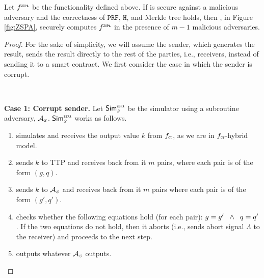 

\begin{theorem}\label{theorem::ZSPA-comp-correctness}
Let $f^{\scriptscriptstyle \mathtt{ZSPA}}$ be the functionality defined above. If \ct is secure against a malicious adversary and the correctness of $\mathtt{PRF}$, $\mathtt{H}$, and Merkle tree holds, then \zspa,  in Figure \ref{fig:ZSPA}, securely computes $f^{\scriptscriptstyle \mathtt{ZSPA}}$ in the presence of $m-1 $ malicious  adversaries. 
\end{theorem}


\begin{proof}
For the sake of simplicity, we will assume the sender, which generates the result, sends the result directly to the rest of the parties, i.e., receivers, instead of sending it to a smart contract. We first consider the case in which the sender is corrupt. 

\

\noindent\textbf{Case 1: Corrupt sender.}  Let $\mathsf{Sim}^{\scriptscriptstyle \mathtt{ZSPA}}_{\scriptscriptstyle S}$ be the simulator using a subroutine adversary, $\mathcal{A}_{\scriptscriptstyle S}$. $\mathsf{Sim}^{\scriptscriptstyle \mathtt{ZSPA}}_{\scriptscriptstyle S}$ works as follows. 
%
\begin{enumerate}
%
\item simulates  \ct  and receives the output value $k$ from $f_{\scriptscriptstyle \mathtt{CT}}$, as we are in $f_{\scriptscriptstyle \mathtt{CT}}$-hybrid model.
%
\item sends $k$ to TTP and receives back from it $m$ pairs, where each pair is of the form $( g,  q)$. 
%
\item sends $ k$ to $\mathcal{A}_{\scriptscriptstyle S}$ and receives back from it $m$ pairs  where each pair is of the form $( g',  q')$. 
%
\item checks whether the following equations hold (for each pair): $ g= g' \hspace{2mm} \wedge  \hspace{2mm}  q= q'$. If the two equations do not hold, then it aborts (i.e., sends abort signal $\Lambda$ to the receiver) and proceeds to the next step.
%
\item outputs whatever $\mathcal{A}_{\scriptscriptstyle S}$ outputs.
%
 \end{enumerate}
 

\end{proof}
